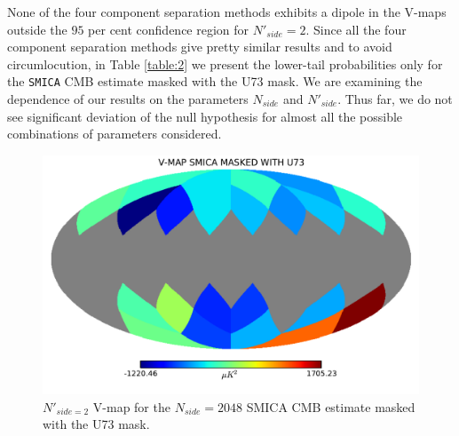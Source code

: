 None of the four component separation methods exhibits a dipole in the V-maps outside the $95$ per cent confidence region for $N'_{side}=2$. %
Since all the four component separation methods give pretty similar results and to avoid circumlocution, in Table \ref{table:2} we present the lower-tail probabilities only for the \texttt{SMICA} CMB estimate masked with the U73 mask. We are examining the dependence of our results on the parameters $N_{side}$ and $N'_{side}$. Thus far, we do not see significant deviation of the null hypothesis for almost all the possible combinations of parameters considered.%
 

\begin{figure}
\centering
\includegraphics[width=\textwidth]{figures/chapter-vsk/vmap-u73-smica.pdf}
\caption{$N'_{side = 2}$ V-map for the $N_{side} = 2048$ SMICA CMB estimate masked with the U73 mask.}
\label{Fig:3}
\end{figure}


